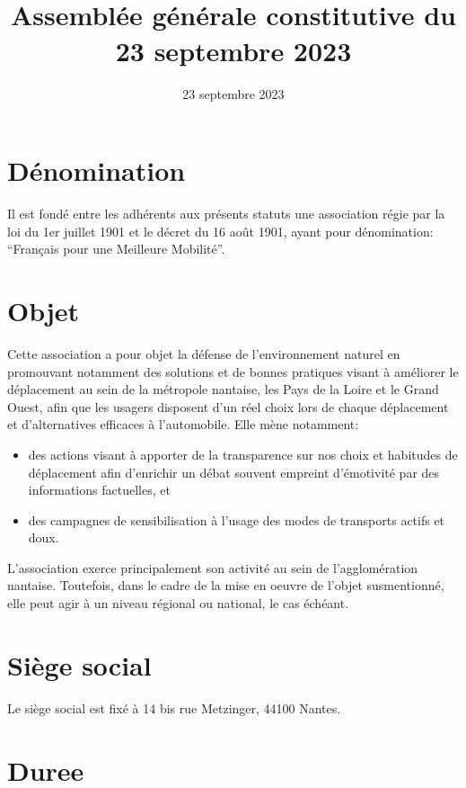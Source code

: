 \documentclass[11 pt]{article}
\title{\fmm \\[4mm]
\large Assemblée générale constitutive du 23 septembre 2023}
\date{23 septembre 2023}
\newcommand\fmm[0]{Français pour une Meilleure Mobilité}
\begin{document}
\maketitle

\section{Dénomination}

Il est fondé entre les adhérents aux présents statuts une association
régie par la loi du 1er juillet 1901 et le décret du 16 août 1901,
ayant pour dénomination: ``\fmm''.


\section{Objet}

Cette association a pour objet la défense de l'environnement naturel
en promouvant notamment des solutions et de bonnes pratiques visant à
améliorer le déplacement au sein de la métropole nantaise, les Pays de
la Loire et le Grand Ouest, afin que les usagers disposent d'un réel
choix lors de chaque déplacement et d'alternatives efficaces à
l'automobile. Elle mène notamment:

\begin{itemize}
\item des actions visant à apporter de la transparence sur nos choix
  et habitudes de déplacement afin d'enrichir un débat souvent
  empreint d'émotivité par des informations factuelles, et
\item des campagnes de sensibilisation à l'usage des modes de
  transports actifs et doux.
\end{itemize}

L'association exerce principalement son activité au sein de
l’agglomération nantaise. Toutefois, dans le cadre de la mise en
oeuvre de l'objet susmentionné, elle peut agir à un niveau régional ou
national, le cas échéant.

\section{Siège social}

Le siège social est fixé à 14 bis rue Metzinger, 44100 Nantes.

\section{Duree}
\end{document}
